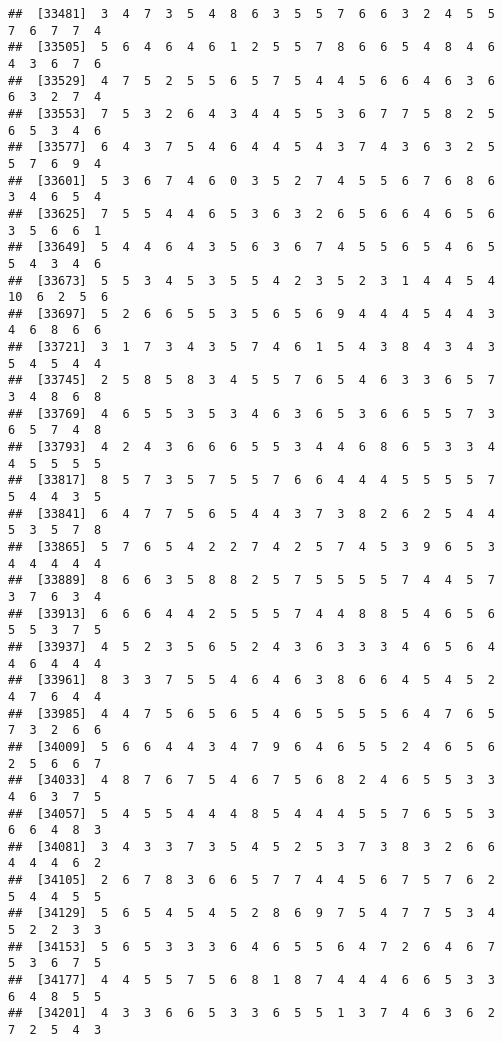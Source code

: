 \documentclass[
]{book}
\begin{document}
\begin{verbatim}
##  [33481]  3  4  7  3  5  4  8  6  3  5  5  7  6  6  3  2  4  5  5  7  6  7  7  4
##  [33505]  5  6  4  6  4  6  1  2  5  5  7  8  6  6  5  4  8  4  6  4  3  6  7  6
##  [33529]  4  7  5  2  5  5  6  5  7  5  4  4  5  6  6  4  6  3  6  6  3  2  7  4
##  [33553]  7  5  3  2  6  4  3  4  4  5  5  3  6  7  7  5  8  2  5  6  5  3  4  6
##  [33577]  6  4  3  7  5  4  6  4  4  5  4  3  7  4  3  6  3  2  5  5  7  6  9  4
##  [33601]  5  3  6  7  4  6  0  3  5  2  7  4  5  5  6  7  6  8  6  3  4  6  5  4
##  [33625]  7  5  5  4  4  6  5  3  6  3  2  6  5  6  6  4  6  5  6  3  5  6  6  1
##  [33649]  5  4  4  6  4  3  5  6  3  6  7  4  5  5  6  5  4  6  5  5  4  3  4  6
##  [33673]  5  5  3  4  5  3  5  5  4  2  3  5  2  3  1  4  4  5  4 10  6  2  5  6
##  [33697]  5  2  6  6  5  5  3  5  6  5  6  9  4  4  4  5  4  4  3  4  6  8  6  6
##  [33721]  3  1  7  3  4  3  5  7  4  6  1  5  4  3  8  4  3  4  3  5  4  5  4  4
##  [33745]  2  5  8  5  8  3  4  5  5  7  6  5  4  6  3  3  6  5  7  3  4  8  6  8
##  [33769]  4  6  5  5  3  5  3  4  6  3  6  5  3  6  6  5  5  7  3  6  5  7  4  8
##  [33793]  4  2  4  3  6  6  6  5  5  3  4  4  6  8  6  5  3  3  4  4  5  5  5  5
##  [33817]  8  5  7  3  5  7  5  5  7  6  6  4  4  4  5  5  5  5  7  5  4  4  3  5
##  [33841]  6  4  7  7  5  6  5  4  4  3  7  3  8  2  6  2  5  4  4  5  3  5  7  8
##  [33865]  5  7  6  5  4  2  2  7  4  2  5  7  4  5  3  9  6  5  3  4  4  4  4  4
##  [33889]  8  6  6  3  5  8  8  2  5  7  5  5  5  5  7  4  4  5  7  3  7  6  3  4
##  [33913]  6  6  6  4  4  2  5  5  5  7  4  4  8  8  5  4  6  5  6  5  5  3  7  5
##  [33937]  4  5  2  3  5  6  5  2  4  3  6  3  3  3  4  6  5  6  4  4  6  4  4  4
##  [33961]  8  3  3  7  5  5  4  6  4  6  3  8  6  6  4  5  4  5  2  4  7  6  4  4
##  [33985]  4  4  7  5  6  5  6  5  4  6  5  5  5  5  6  4  7  6  5  7  3  2  6  6
##  [34009]  5  6  6  4  4  3  4  7  9  6  4  6  5  5  2  4  6  5  6  2  5  6  6  7
##  [34033]  4  8  7  6  7  5  4  6  7  5  6  8  2  4  6  5  5  3  3  4  6  3  7  5
##  [34057]  5  4  5  5  4  4  4  8  5  4  4  4  5  5  7  6  5  5  3  6  6  4  8  3
##  [34081]  3  4  3  3  7  3  5  4  5  2  5  3  7  3  8  3  2  6  6  4  4  4  6  2
##  [34105]  2  6  7  8  3  6  6  5  7  7  4  4  5  6  7  5  7  6  2  5  4  4  5  5
##  [34129]  5  6  5  4  5  4  5  2  8  6  9  7  5  4  7  7  5  3  4  5  2  2  3  3
##  [34153]  5  6  5  3  3  3  6  4  6  5  5  6  4  7  2  6  4  6  7  5  3  6  7  5
##  [34177]  4  4  5  5  7  5  6  8  1  8  7  4  4  4  6  6  5  3  3  6  4  8  5  5
##  [34201]  4  3  3  6  6  5  3  3  6  5  5  1  3  7  4  6  3  6  2  7  2  5  4  3

\end{verbatim}
\end{document}
